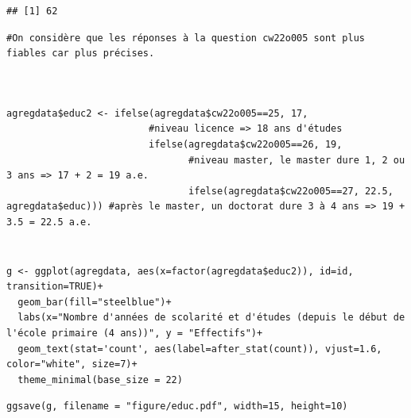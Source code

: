 \documentclass[a4paper, french, 11 pt]{article}\usepackage[]{graphicx}\usepackage[]{xcolor}
\makeatletter
\newenvironment{kframe}{%
 \def\at@end@of@kframe{}%
 \ifinner\ifhmode%
  \def\at@end@of@kframe{\end{minipage}}%
  \begin{minipage}{\columnwidth}%
 \fi\fi%
 \def\FrameCommand##1{\hskip\@totalleftmargin \hskip-\fboxsep
 \colorbox{shadecolor}{##1}\hskip-\fboxsep
     \hskip-\linewidth \hskip-\@totalleftmargin \hskip\columnwidth}%
 \MakeFramed {\advance\hsize-\width
   \@totalleftmargin\z@ \linewidth\hsize
   \@setminipage}}%
 {\par\unskip\endMakeFramed%
 \at@end@of@kframe}
\newenvironment{knitrout}{}{} %
\makeatother
\begin{document}
\begin{knitrout}
\begin{kframe}
\begin{lstlisting}[basicstyle=\ttfamily,breaklines=true]
## [1] 62
\end{lstlisting}
\begin{lstlisting}[basicstyle=\ttfamily,breaklines=true]
#On considère que les réponses à la question cw22o005 sont plus fiables car plus précises.\end{lstlisting}
\begin{lstlisting}[basicstyle=\ttfamily,breaklines=true]
\end{lstlisting}
\begin{lstlisting}[basicstyle=\ttfamily,breaklines=true]
\end{lstlisting}
\begin{lstlisting}[basicstyle=\ttfamily,breaklines=true]
\end{lstlisting}
\begin{lstlisting}[basicstyle=\ttfamily,breaklines=true]
agregdata$educ2 <- ifelse(agregdata$cw22o005==25, 17,
                         #niveau licence => 18 ans d'études
                         ifelse(agregdata$cw22o005==26, 19,
                                #niveau master, le master dure 1, 2 ou 3 ans => 17 + 2 = 19 a.e.
                                ifelse(agregdata$cw22o005==27, 22.5, agregdata$educ))) #après le master, un doctorat dure 3 à 4 ans => 19 + 3.5 = 22.5 a.e.\end{lstlisting}
\begin{lstlisting}[basicstyle=\ttfamily,breaklines=true]
\end{lstlisting}
\begin{lstlisting}[basicstyle=\ttfamily,breaklines=true]
\end{lstlisting}
\begin{lstlisting}[basicstyle=\ttfamily,breaklines=true]
g <- ggplot(agregdata, aes(x=factor(agregdata$educ2)), id=id, transition=TRUE)+
  geom_bar(fill="steelblue")+
  labs(x="Nombre d'années de scolarité et d'études (depuis le début de l'école primaire (4 ans))", y = "Effectifs")+
  geom_text(stat='count', aes(label=after_stat(count)), vjust=1.6, color="white", size=7)+
  theme_minimal(base_size = 22)\end{lstlisting}
\begin{lstlisting}[basicstyle=\ttfamily,breaklines=true]
ggsave(g, filename = "figure/educ.pdf", width=15, height=10)\end{lstlisting}



\end{kframe}
\end{knitrout}
\end{document}

